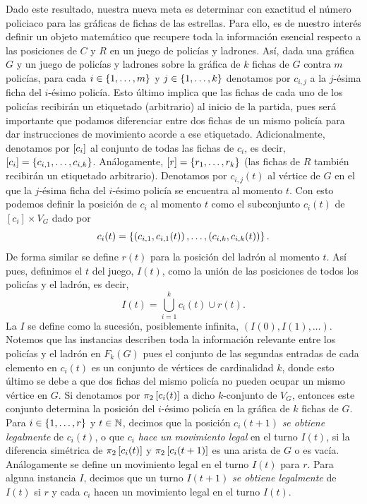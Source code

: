 Dado este resultado, nuestra nueva meta es determinar con exactitud el n\'umero
policiaco para las gr\'aficas de fichas de las estrellas. Para ello, es de
nuestro inter\'es definir un objeto matem\'atico que recupere toda la
informaci\'on esencial respecto a las posiciones de $C$ y $R$ en un juego de
polic\'ias y ladrones.   As\'i, dada una gr\'afica $G$ y un juego de polic\'ias
y ladrones sobre la gr\'afica de $k$ fichas de $G$ contra $m$ polic\'ias, para
cada $i\in \{1,\dots, m\}$ y $j\in\{1,\dots, k\}$ denotamos por $c_{i,j}$ a la
$j$-\'esima ficha del $i$-\'esimo polic\'ia. Esto \'ultimo implica que las
fichas de cada uno de los polic\'ias recibir\'an un etiquetado (arbitrario) al
inicio de la partida, pues ser\'a importante que podamos diferenciar entre dos
fichas de un mismo polic\'ia para dar instrucciones de movimiento acorde a ese
etiquetado. Adicionalmente, denotamos por $\left[ c_i\right]$ al conjunto de todas las
fichas de $c_i$, es decir, $\left[ c_i\right] = \{c_{i,1},\dots, c_{i,k}\}$. An\'alogamente,
$\left[ r\right]=\{r_1,\dots, r_k\}$ (las fichas de $R$ tambi\'en recibir\'an un etiquetado
arbitrario). Denotamos por $c_{i,j}(t)$ al v\'ertice de $G$ en el que la
$j$-\'esima ficha del $i$-\'esimo polic\'ia se encuentra al momento $t$. Con
esto podemos definir la posici\'on de $c_i$ al momento $t$ como el subconjunto
$c_i(t)$ de $[c_i] \times V_G$ dado por
\[
    c_{i}(t) = \left\{ \left( c_{i,1},c_{i,1}(t)\right),\dots,\left( c_{i,k},c_{i,k}(t)\right)\right\}.
\]
De forma similar se define $r(t)$ para la posici\'on del ladr\'on al momento
$t$. As\'i pues, definimos el  $t$ del juego, $I(t)$, como la
uni\'on de las posiciones de todos los polic\'ias y el ladr\'on, es decir,
\[
    I(t) = \bigcup_{i=1}^k c_{i}(t) \cup r(t).
\]
La  $I$ se define como la sucesi\'on, posiblemente infinita,
$(I(0), I(1), \dots)$.   Notemos que las instancias describen toda la
informaci\'on relevante entre los polic\'ias y el ladr\'on en $F_k(G)$ pues el
conjunto de las segundas entradas de cada elemento en $c_{i}(t)$ es un conjunto
de v\'ertices de cardinalidad $k$, donde esto \'ultimo se debe a que dos fichas
del mismo polic\'ia no pueden ocupar un mismo v\'ertice en $G$. Si denotamos por
$\pi_2\left[ c_i(t)\right]$ a dicho $k$-conjunto de $V_G$, entonces este conjunto
determina la posici\'on del $i$-\'esimo polic\'ia en la gr\'afica de $k$ fichas
de $G$.   Para $i \in \{1,\dots, r\}$ y $t \in \mathbb{N}$, decimos que la posici\'on
$c_i(t+1)$ \textit{se obtiene legalmente} de $c_i(t)$, o que $c_i$ \textit{hace
un movimiento legal} en el turno $I(t)$, si la diferencia sim\'etrica de
$\pi_2\left[ c_i(t)\right]$ y $\pi_2\left[ c_i(t+1)\right]$ es una arista de $G$ o es vac\'ia.
An\'alogamente se define un movimiento legal en el turno $I(t)$ para $r$. Para
alguna instancia $I$, decimos que un turno $I(t+1)$ \textit{se obtiene
legalmente} de $I(t)$ si $r$ y cada $c_i$ hacen un movimiento legal en el turno
$I(t)$.

